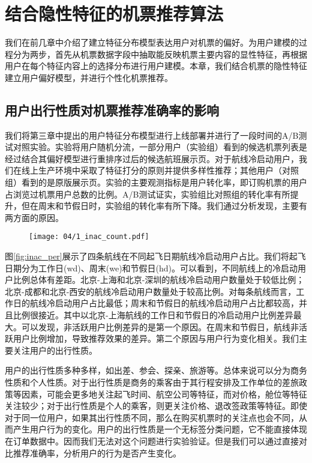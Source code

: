 
\chapter{结合隐性特征的机票推荐算法}
\label{chap:latent}

我们在前几章中介绍了建立特征分布模型表达用户对机票的偏好。为用户建模的过程分为两步，首先从机票数据字段中抽取能反映机票主要内容的显性特征，再根据用户在每个特征内容上的选择分布进行用户建模。本章，我们结合机票的隐性特征建立用户偏好模型，并进行个性化机票推荐。

\section{用户出行性质对机票推荐准确率的影响}

我们将第三章中提出的用户特征分布模型进行上线部署并进行了一段时间的A/B测试对照实验。实验将用户随机分流，一部分用户（实验组）看到的候选机票列表是经过结合其偏好模型进行重排序过后的候选航班展示页。对于航线冷启动用户，我们在线上生产环境中采取了特征打分的原则并提供多样性推荐；其他用户（对照组）看到的是原版展示页。实验的主要观测指标是用户转化率，即订购机票的用户占浏览过机票用户总数的比例。A/B测试证实，实验组比对照组的转化率有所提升，但在周末和节假日时，实验组的转化率有所下降。我们通过分析发现，主要有两方面的原因。

\begin{figure}
 \centering
 \texttt{[image: 04/1\_inac\_count.pdf]}
\end{figure}

图\ref{fig:inac_per}展示了四条航线在不同起飞日期航线冷启动用户占比。我们将起飞日期分为工作日(wd)、周末(we)和节假日(hd)。可以看到，不同航线上的冷启动用户比例总体有差距。北京-上海和北京-深圳的航线冷启动用户数量处于较低比例；北京-成都和北京-西安的航线冷启动用户数量处于较高比例。对每条航线而言，工作日的航线冷启动用户占比最低；周末和节假日的航线冷启动用户占比都较高，并且比例很接近。其中以北京-上海航线的工作日和节假日的冷启动用户比例差异最大。可以发现，非活跃用户比例差异的是第一个原因。在周末和节假日，航线非活跃用户比例增加，导致推荐效果的差异。第二个原因与用户行为变化相关。我们主要关注用户的出行性质。

用户的出行性质多种多样，如出差、参会、探亲、旅游等。总体来说可以分为商务性质和个人性质。对于出行性质是商务的乘客由于其行程安排及工作单位的差旅政策等因素，可能会更多地关注起飞时间、航空公司等特征，而对价格，舱位等特征关注较少；对于出行性质是个人的乘客，则更关注价格、退改签政策等特征。即使对于同一位用户，如果其出行性质不同，那么在购买机票时的关注点也会不同，从而产生用户行为的变化。用户的出行性质是一个无标签分类问题，它不能直接体现在订单数据中。因而我们无法对这个问题进行实验验证。但是我们可以通过直接对比推荐准确率，分析用户的行为是否产生变化。

